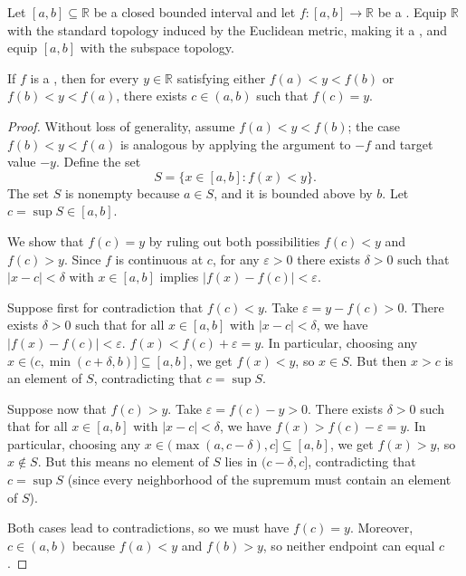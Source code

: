 \begin{theorem} \label{theorem:intermediate_value_theorem_for_continuous_functions_on_real_intervals_valued_in_the_real_numbers}
    Let $[a, b] \subseteq \mathbb{R}$ be a closed bounded interval and let $f : [a, b] \to \mathbb{R}$ be a . Equip $\mathbb{R}$ with the standard topology induced by the Euclidean metric, making it a , and equip $[a, b]$ with the subspace topology.

    If $f$ is a , then for every $y \in \mathbb{R}$ satisfying either $f(a) < y < f(b)$ or $f(b) < y < f(a)$, there exists $c \in (a, b)$ such that $f(c) = y$.
\end{theorem}

\begin{proof}
    Without loss of generality, assume $f(a) < y < f(b)$; the case $f(b) < y < f(a)$ is analogous by applying the argument to $-f$ and target value $-y$. 
    Define the set
    $$S = \{ x \in [a, b] : f(x) < y \}.$$
    The set $S$ is nonempty because $a \in S$, and it is bounded above by $b$. Let $c = \sup S \in [a, b]$.

    We show that $f(c) = y$ by ruling out both possibilities $f(c) < y$ and $f(c) > y$. Since $f$ is continuous at $c$, for any $\varepsilon > 0$ there exists $\delta > 0$ such that $|x - c| < \delta$ with $x \in [a, b]$ implies $|f(x) - f(c)| < \varepsilon$.

    Suppose first for contradiction that $f(c) < y$. Take $\varepsilon = y - f(c) > 0$. There exists $\delta > 0$ such that for all $x \in [a, b]$ with $|x - c| < \delta$, we have $|f(x)-f(c)| < \varepsilon$. $f(x) < f(c) + \varepsilon = y$. In particular, choosing any $x \in (c, \min(c + \delta, b)] \subseteq [a, b]$, we get $f(x) < y$, so $x \in S$. But then $x > c$ is an element of $S$, contradicting that $c = \sup S$.

    Suppose now that $f(c) > y$. Take $\varepsilon = f(c) - y > 0$. There exists $\delta > 0$ such that for all $x \in [a, b]$ with $|x - c| < \delta$, we have $f(x) > f(c) - \varepsilon = y$. In particular, choosing any $x \in (\max(a, c - \delta), c] \subseteq [a, b]$, we get $f(x) > y$, so $x \notin S$. But this means no element of $S$ lies in $(c - \delta, c]$, contradicting that $c = \sup S$ (since every neighborhood of the supremum must contain an element of $S$).

    Both cases lead to contradictions, so we must have $f(c) = y$. Moreover, $c \in (a, b)$ because $f(a) < y$ and $f(b) > y$, so neither endpoint can equal $c$.
\end{proof}

